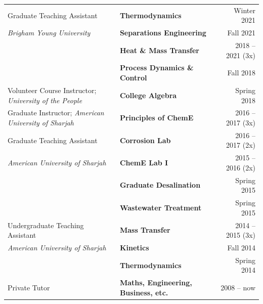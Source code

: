 \documentclass[letterpaper,11pt]{article}
\begin{document}
\begin{longtable}{@{}p{}p{}r@{}}
	Graduate Teaching Assistant                                    	& \textbf{Thermodynamics}                                      & Winter 2021       \\ [3pt]
	\textit{Brigham Young University}                              	& \textbf{Separations Engineering}                             & Fall 2021         \\ [3pt]
									& \textbf{Heat \& Mass Transfer}                               & 2018 -- 2021 (3x) \\ [3pt]
									& \textbf{Process Dynamics \& Control}                         & Fall 2018         \\ [8pt]
	Volunteer Course Instructor; \textit{University of the People} 	& \textbf{College Algebra}                                     & Spring 2018       \\ [8pt]
	Graduate Instructor; \textit{American University of Sharjah}   	& \textbf{Principles of ChemE}                                 & 2016 -- 2017 (3x) \\ [8pt]
	Graduate Teaching Assistant                                    	& \textbf{Corrosion Lab}                                       & 2016 -- 2017 (2x) \\ [3pt]
	\textit{American University of Sharjah}                        	& \textbf{ChemE Lab I}                                         & 2015 -- 2016 (2x) \\ [3pt]
									& \textbf{Graduate Desalination}                               & Spring 2015       \\ [3pt]
									& \textbf{Wastewater Treatment}                                & Spring 2015       \\ [8pt]
	Undergraduate Teaching Assistant                               	& \textbf{Mass Transfer}                                       & 2014 -- 2015 (3x) \\ [3pt]
	\textit{American University of Sharjah}                        	& \textbf{Kinetics}                                            & Fall 2014         \\ [3pt]
									& \textbf{Thermodynamics}                                      & Spring 2014       \\ [8pt]
	Private Tutor                                                  	& \textbf{Maths, Engineering, Business, etc.}                  & 2008 -- now
\end{longtable}
\end{document}
